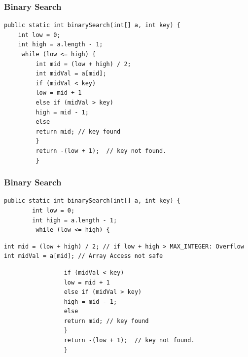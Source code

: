\documentclass{beamer}
\begin{document}
\begin{frame} [fragile]
	\frametitle{Binary Search}
	\center
\begin{lstlisting}
public static int binarySearch(int[] a, int key) {
	int low = 0;
	int high = a.length - 1;
	 while (low <= high) {
		 int mid = (low + high) / 2;
		 int midVal = a[mid];
		 if (midVal < key)
		 low = mid + 1
		 else if (midVal > key)
		 high = mid - 1;
		 else
		 return mid; // key found
		 }
		 return -(low + 1);  // key not found.
		 }

\end{lstlisting}
\end{frame}

\begin{frame} [fragile]
        \frametitle{Binary Search}

        \center
\begin{lstlisting}
public static int binarySearch(int[] a, int key) {
        int low = 0;
        int high = a.length - 1;
         while (low <= high) {
\end{lstlisting}
\vspace{-\baselineskip}
\begin{lstlisting}[backgroundcolor=\color{pink}]
int mid = (low + high) / 2; // if low + high > MAX_INTEGER: Overflow
int midVal = a[mid]; // Array Access not safe
\end{lstlisting}
\vspace{-\baselineskip}
\begin{lstlisting}
                 if (midVal < key)
                 low = mid + 1
                 else if (midVal > key)
                 high = mid - 1;
                 else
                 return mid; // key found
                 }
                 return -(low + 1);  // key not found.
                 }

\end{lstlisting}
\end{frame}
\end{document}
